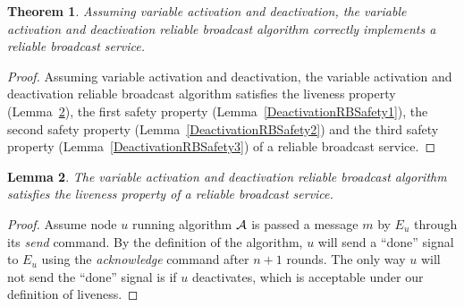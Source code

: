 \documentclass[english]{article}
\newtheorem{theorem}{Theorem}[section]
\newtheorem{lemma}[theorem]{Lemma}
\begin{document}
\begin{theorem}
\label{DeactivationReliableBroadcast}
Assuming variable activation and deactivation, the variable activation and deactivation reliable broadcast algorithm correctly implements a reliable broadcast service.
\end{theorem}
\begin{proof}
Assuming variable activation and deactivation, the variable activation and deactivation reliable broadcast algorithm satisfies the liveness property (Lemma~\ref{DeactivationRBLiveness}), 
the first safety property (Lemma~\ref{DeactivationRBSafety1}),
the second safety property (Lemma~\ref{DeactivationRBSafety2}) and 
the third safety property (Lemma~\ref{DeactivationRBSafety3}) of a reliable broadcast service.
\end{proof}

\begin{lemma}
\label{DeactivationRBLiveness}
The variable activation and deactivation reliable broadcast algorithm satisfies the liveness property of a reliable broadcast service.
\end{lemma}
\begin{proof}
Assume node $u$ running algorithm $\cal A$ is passed a message $m$ by $E_u$ through its \textit{send} command. By the definition of the algorithm, $u$ will send  a ``done'' signal to $E_u$ using the \textit{acknowledge} command after $n+1$ rounds. The only way $u$ will not send the ``done'' signal is if $u$ deactivates, which is acceptable under our definition of liveness.
\end{proof}
\end{document}

